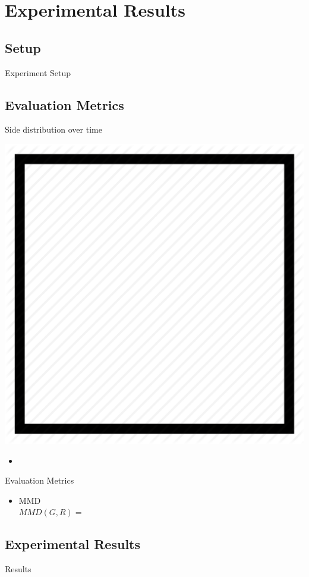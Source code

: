 \section{Experimental Results}
\subsection{Setup}
\begin{frame}{Experiment Setup}
    
\end{frame}

\subsection{Evaluation Metrics}
\begin{frame}{Side distribution over time}
    \begin{center}
        \includegraphics[height=0.3\textheight]{assets/figures/square.png}
    \end{center}
    \begin{itemize}
        \item 
    \end{itemize}
\end{frame}
\begin{frame}{Evaluation Metrics}
    \begin{itemize}
        \item MMD \\
        $MMD(G, R) = $
    \end{itemize}
\end{frame}
\subsection{Experimental Results}
\begin{frame}{Results}
    
\end{frame}